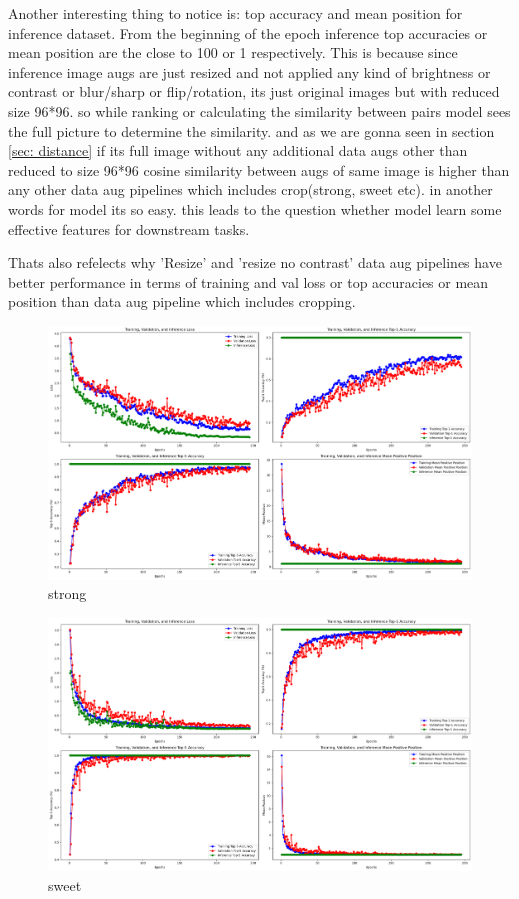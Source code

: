 Another interesting thing to notice is: top accuracy and mean position for inference dataset. From the beginning of the epoch inference top accuracies or mean position are the 
 close to 100 or 1 respectively. This is because since inference image augs are just resized and not applied any kind of brightness or contrast or blur/sharp or flip/rotation,
  its just original images but with reduced size 96*96. so while ranking or calculating the similarity between pairs model sees the full picture to determine the similarity. and as we are gonna seen in section \ref{sec: distance} if its full image  without any additional data augs other than reduced to size 96*96 cosine similarity between augs
   of same image is higher than any other data aug pipelines which includes crop(strong, sweet etc).  in another words for model its so easy. this leads to the question whether model learn some effective features for downstream tasks.

Thats also refelects why 'Resize' and 'resize no contrast' data aug pipelines have better performance in terms of training and val loss or top accuracies or mean position 
than data aug pipeline which includes cropping.


\begin{figure}[H]
  \centering
  \includegraphics[scale=0.3]{figures/strong.png} 
  \caption{strong}
  \label{fig:strong_64}
\end{figure}

\begin{figure}[H]
  \centering
  \includegraphics[scale=0.3]{figures/sweet_bs64.png} 
  \caption{sweet}
  \label{fig:sweet_bs64}
\end{figure}


